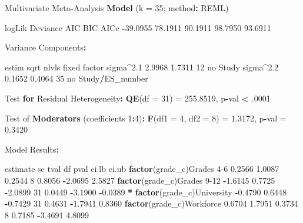 \documentclass[
]{book}
\newenvironment{Shaded}{\begin{snugshade}}{\end{snugshade}}
\newcommand{\AttributeTok}[1]{\textcolor[rgb]{0.13,0.29,0.53}{#1}}
\newcommand{\ControlFlowTok}[1]{\textcolor[rgb]{0.13,0.29,0.53}{\textbf{#1}}}
\newcommand{\DecValTok}[1]{\textcolor[rgb]{0.00,0.00,0.81}{#1}}
\newcommand{\FloatTok}[1]{\textcolor[rgb]{0.00,0.00,0.81}{#1}}
\newcommand{\FunctionTok}[1]{\textcolor[rgb]{0.13,0.29,0.53}{\textbf{#1}}}
\newcommand{\NormalTok}[1]{#1}
\newcommand{\OtherTok}[1]{\textcolor[rgb]{0.56,0.35,0.01}{#1}}
\newcommand{\SpecialCharTok}[1]{\textcolor[rgb]{0.81,0.36,0.00}{\textbf{#1}}}
\begin{document}
\begin{Shaded}
\begin{Highlighting}[]
\NormalTok{Multivariate Meta}\SpecialCharTok{{-}}\NormalTok{Analysis }\FunctionTok{Model}\NormalTok{ (}\AttributeTok{k =} \DecValTok{35}\NormalTok{; method}\SpecialCharTok{:}\NormalTok{ REML)}

\NormalTok{  logLik  Deviance       AIC       BIC      AICc   }
\SpecialCharTok{{-}}\FloatTok{39.0955}   \FloatTok{78.1911}   \FloatTok{90.1911}   \FloatTok{98.7950}   \FloatTok{93.6911}   

\NormalTok{Variance Components}\SpecialCharTok{:}

\NormalTok{            estim    sqrt  nlvls  fixed           factor }
\NormalTok{sigma}\SpecialCharTok{\^{}}\FloatTok{2.1}  \FloatTok{2.9968}  \FloatTok{1.7311}     \DecValTok{12}\NormalTok{     no            Study }
\NormalTok{sigma}\SpecialCharTok{\^{}}\FloatTok{2.2}  \FloatTok{0.1652}  \FloatTok{0.4064}     \DecValTok{35}\NormalTok{     no  Study}\SpecialCharTok{/}\NormalTok{ES\_number }

\NormalTok{Test }\ControlFlowTok{for}\NormalTok{ Residual Heterogeneity}\SpecialCharTok{:}
\FunctionTok{QE}\NormalTok{(}\AttributeTok{df =} \DecValTok{31}\NormalTok{) }\OtherTok{=} \FloatTok{255.8519}\NormalTok{, p}\SpecialCharTok{{-}}\NormalTok{val }\SpecialCharTok{\textless{}}\NormalTok{ .}\DecValTok{0001}

\NormalTok{Test of }\FunctionTok{Moderators}\NormalTok{ (coefficients }\DecValTok{1}\SpecialCharTok{:}\DecValTok{4}\NormalTok{)}\SpecialCharTok{:}
\FunctionTok{F}\NormalTok{(}\AttributeTok{df1 =} \DecValTok{4}\NormalTok{, }\AttributeTok{df2 =} \DecValTok{8}\NormalTok{) }\OtherTok{=} \FloatTok{1.3172}\NormalTok{, p}\SpecialCharTok{{-}}\NormalTok{val }\OtherTok{=} \FloatTok{0.3420}

\NormalTok{Model Results}\SpecialCharTok{:}

\NormalTok{                            estimate      se     tval  df    pval    ci.lb    ci.ub    }
\FunctionTok{factor}\NormalTok{(grade\_c)Grades }\DecValTok{4{-}6}     \FloatTok{0.2566}  \FloatTok{1.0087}   \FloatTok{0.2544}   \DecValTok{8}  \FloatTok{0.8056}  \SpecialCharTok{{-}}\FloatTok{2.0695}   \FloatTok{2.5827}    
\FunctionTok{factor}\NormalTok{(grade\_c)Grades }\DecValTok{9{-}12}   \SpecialCharTok{{-}}\FloatTok{1.6145}  \FloatTok{0.7725}  \SpecialCharTok{{-}}\FloatTok{2.0899}  \DecValTok{31}  \FloatTok{0.0449}  \SpecialCharTok{{-}}\FloatTok{3.1900}  \SpecialCharTok{{-}}\FloatTok{0.0389}  \SpecialCharTok{*} 
\FunctionTok{factor}\NormalTok{(grade\_c)University    }\SpecialCharTok{{-}}\FloatTok{0.4790}  \FloatTok{0.6448}  \SpecialCharTok{{-}}\FloatTok{0.7429}  \DecValTok{31}  \FloatTok{0.4631}  \SpecialCharTok{{-}}\FloatTok{1.7941}   \FloatTok{0.8360}    
\FunctionTok{factor}\NormalTok{(grade\_c)Workforce      }\FloatTok{0.6704}  \FloatTok{1.7951}   \FloatTok{0.3734}   \DecValTok{8}  \FloatTok{0.7185}  \SpecialCharTok{{-}}\FloatTok{3.4691}   \FloatTok{4.8099}    


\end{Highlighting}
\end{Shaded}
\end{document}
